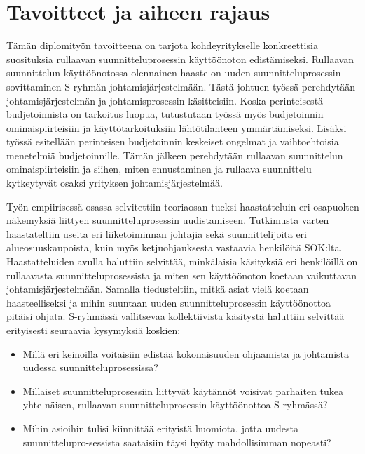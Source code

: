\documentclass[12pt,a4paper,oneside,pdftex]{report}
\begin{document}
\section{Tavoitteet ja aiheen rajaus}
\label{section:tavoitteet}

Tämän diplomityön tavoitteena on tarjota kohdeyritykselle konkreettisia suosituksia rullaavan suunnitteluprosessin käyttöönoton edistämiseksi. Rullaavan suunnittelun käyttöönotossa olennainen haaste on uuden suunnitteluprosessin sovittaminen S-ryhmän johtamisjärjestelmään. Tästä johtuen työssä perehdytään johtamisjärjestelmän ja johtamisprosessin käsitteisiin. Koska perinteisestä budjetoinnista on tarkoitus luopua, tutustutaan työssä myös budjetoinnin ominaispiirteisiin ja käyttötarkoituksiin lähtötilanteen ymmärtämiseksi. Lisäksi työssä esitellään perinteisen budjetoinnin keskeiset ongelmat ja vaihtoehtoisia menetelmiä budjetoinnille. Tämän jälkeen perehdytään rullaavan suunnittelun ominaispiirteisiin ja siihen, miten ennustaminen ja rullaava suunnittelu kytkeytyvät osaksi yrityksen johtamisjärjestelmää.

Työn empiirisessä osassa selvitettiin teoriaosan tueksi haastatteluin eri osapuolten näkemyksiä liittyen suunnitteluprosessin uudistamiseen. Tutkimusta varten haastateltiin useita eri liiketoiminnan johtajia sekä suunnittelijoita eri alueosuuskaupoista, kuin myös ketjuohjauksesta vastaavia henkilöitä SOK:lta. Haastatteluiden avulla haluttiin selvittää, minkälaisia käsityksiä eri henkilöillä on rullaavasta suunnitteluprosessista ja miten sen käyttöönoton koetaan vaikuttavan johtamisjärjestelmään. Samalla tiedusteltiin, mitkä asiat vielä koetaan haasteelliseksi ja mihin suuntaan uuden suunnitteluprosessin käyttöönottoa pitäisi ohjata. S-ryhmässä vallitsevaa kollektiivista käsitystä haluttiin selvittää erityisesti seuraavia kysymyksiä koskien:


\begin{itemize}
\setlength{\itemsep}{0pt}
\item Millä eri keinoilla voitaisiin edistää kokonaisuuden ohjaamista ja johtamista uudessa suunnitteluprosessissa?
\item Millaiset suunnitteluprosessiin liittyvät käytännöt voisivat parhaiten tukea yhte-näisen, rullaavan suunnitteluprosessin käyttöönottoa S-ryhmässä?
\item Mihin asioihin tulisi kiinnittää erityistä huomiota, jotta uudesta suunnittelupro-sessista saataisiin täysi hyöty mahdollisimman nopeasti?
\end{itemize}
\end{document}
